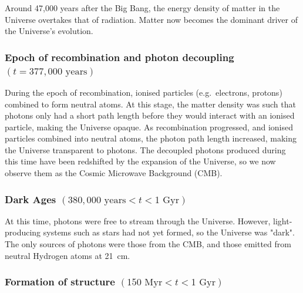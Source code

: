 \documentclass[]{book}
\begin{document}
Around 47,000 years after the Big Bang, the energy density of matter in
the Universe overtakes that of radiation. Matter now becomes the
dominant driver of the Universe's evolution.

\hypertarget{epoch-of-recombination-and-photon-decoupling-t-377000text-years}{%
\subsubsection*{\texorpdfstring{Epoch of recombination and photon decoupling \((t = 377,000\text{ years})\)}{Epoch of recombination and photon decoupling (t = 377,000\textbackslash{}text\{ years\})}}\label{epoch-of-recombination-and-photon-decoupling-t-377000text-years}}

During the epoch of recombination, ionised particles (e.g.~electrons,
protons) combined to form neutral atoms. At this stage, the matter
density was such that photons only had a short path length before they
would interact with an ionised particle, making the Universe opaque. As
recombination progressed, and ionised particles combined into neutral
atoms, the photon path length increased, making the Universe transparent
to photons. The decoupled photons produced during this time have been
redshifted by the expansion of the Universe, so we now observe them as
the Cosmic Microwave Background (CMB).

\hypertarget{dark-ages-380000-text-years-t-1text-gyr}{%
\subsubsection*{\texorpdfstring{Dark Ages \((380,000 \text{ years}< t < 1\text{ Gyr})\)}{Dark Ages (380,000 \textbackslash{}text\{ years\}\textless{} t \textless{} 1\textbackslash{}text\{ Gyr\})}}\label{dark-ages-380000-text-years-t-1text-gyr}}

At this time, photons were free to stream through the Universe. However,
light-producing systems such as stars had not yet formed, so the
Universe was "dark". The only sources of photons were those from the
CMB, and those emitted from neutral Hydrogen atoms at 21~cm.

\hypertarget{formation-of-structure-150text-myr-t-1text-gyr}{%
\subsubsection*{\texorpdfstring{Formation of structure \((150\text{ Myr} < t < 1\text{ Gyr})\)}{Formation of structure (150\textbackslash{}text\{ Myr\} \textless{} t \textless{} 1\textbackslash{}text\{ Gyr\})}}\label{formation-of-structure-150text-myr-t-1text-gyr}}
\end{document}
